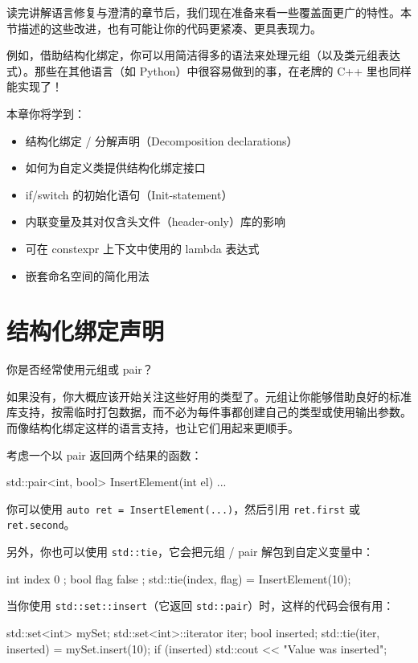 读完讲解语言修复与澄清的章节后，我们现在准备来看一些覆盖面更广的特性。本节描述的这些改进，也有可能让你的代码更紧凑、更具表现力。

例如，借助结构化绑定，你可以用简洁得多的语法来处理元组（以及类元组表达式）。那些在其他语言（如 Python）中很容易做到的事，在老牌的 C++ 里也同样能实现了！

本章你将学到：

\begin{itemize}
\item 结构化绑定 / 分解声明（Decomposition declarations）
\item 如何为自定义类提供结构化绑定接口
\item if/switch 的初始化语句（Init-statement）
\item 内联变量及其对仅含头文件（header-only）库的影响
\item 可在 constexpr 上下文中使用的 lambda 表达式
\item 嵌套命名空间的简化用法
\end{itemize}

\section{结构化绑定声明}

你是否经常使用元组或 pair？

如果没有，你大概应该开始关注这些好用的类型了。元组让你能够借助良好的标准库支持，按需临时打包数据，而不必为每件事都创建自己的类型或使用输出参数。而像结构化绑定这样的语言支持，也让它们用起来更顺手。

考虑一个以 pair 返回两个结果的函数：

\begin{codebox}[cpp]
std::pair<int, bool> InsertElement(int el) { ... }
\end{codebox}

你可以使用 \texttt{auto ret = InsertElement(...)}，然后引用 \texttt{ret.first} 或 \texttt{ret.second}。

另外，你也可以使用 \texttt{std::tie}，它会把元组 / pair 解包到自定义变量中：

\begin{codebox}[cpp]
int index { 0 };
bool flag { false };
std::tie(index, flag) = InsertElement(10);
\end{codebox}

当你使用 \texttt{std::set::insert}（它返回 \texttt{std::pair}）时，这样的代码会很有用：

\begin{codebox}[cpp]
std::set<int> mySet;
std::set<int>::iterator iter;
bool inserted;
std::tie(iter, inserted) = mySet.insert(10);
if (inserted)
std::cout << "Value was inserted\n";
\end{codebox}

